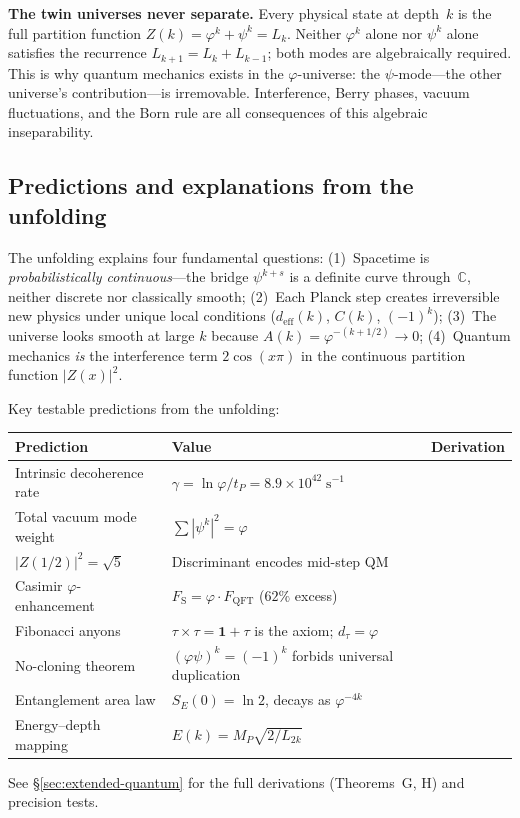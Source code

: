 \documentclass[12pt,a4paper]{article}
\begin{document}
\textbf{The twin universes never separate.} Every physical state at depth~$k$ is the full partition function $Z(k) = \varphi^k + \psi^k = L_k$. Neither $\varphi^k$ alone nor $\psi^k$ alone satisfies the recurrence $L_{k+1} = L_k + L_{k-1}$; both modes are algebraically required. This is why quantum mechanics exists in the $\varphi$-universe: the $\psi$-mode---the other universe's contribution---is irremovable. Interference, Berry phases, vacuum fluctuations, and the Born rule are all consequences of this algebraic inseparability.

\subsection{Predictions and explanations from the unfolding}

The unfolding explains four fundamental questions:  (1)~Spacetime is \emph{probabilistically continuous}---the bridge $\psi^{k+s}$ is a definite curve through~$\mathbb{C}$, neither discrete nor classically smooth; (2)~Each Planck step creates irreversible new physics under unique local conditions ($d_{\mathrm{eff}}(k)$, $C(k)$, $(-1)^k$); (3)~The universe looks smooth at large $k$ because $A(k) = \varphi^{-(k+1/2)} \to 0$; (4)~Quantum mechanics \emph{is} the interference term $2\cos(x\pi)$ in the continuous partition function $|Z(x)|^2$.

Key testable predictions from the unfolding:
\begin{center}\small
\begin{tabular}{|l|l|c|}
\hline
\textbf{Prediction} & \textbf{Value} & \textbf{Derivation} \\
\hline\hline
Intrinsic decoherence rate & $\gamma = \ln\varphi/t_P = 8.9 \times 10^{42}\;\mathrm{s}^{-1}$ \\
Total vacuum mode weight & $\sum|\psi^k|^2 = \varphi$ \\
$|Z(1/2)|^2 = \sqrt{5}$ & Discriminant encodes mid-step QM \\
Casimir $\varphi$-enhancement & $F_{\mathrm{S}} = \varphi \cdot F_{\mathrm{QFT}}$ ($62\%$ excess) \\
Fibonacci anyons & $\tau\times\tau = \mathbf{1}+\tau$ is the axiom; $d_\tau = \varphi$ \\
No-cloning theorem & $(\varphi\psi)^k = (-1)^k$ forbids universal duplication \\
Entanglement area law & $S_E(0) = \ln 2$, decays as $\varphi^{-4k}$ \\
Energy--depth mapping & $E(k) = M_P\sqrt{2/L_{2k}}$ \\
\hline
\end{tabular}
\end{center}
\noindent See \S\ref{sec:extended-quantum} for the full derivations (Theorems~G, H) and precision tests.
\end{document}
